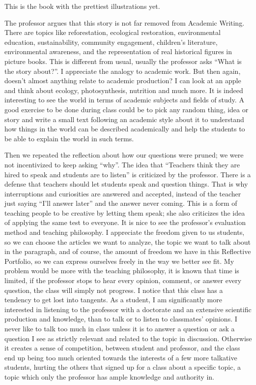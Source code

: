 This is the book with the prettiest illustrations yet.

The professor argues that this story is not far removed from Academic Writing. There are topics like reforestation, ecological restoration, environmental education, sustainability, community engagement, children's literature, environmental awareness, and the representation of real historical figures in picture books. This is different from usual, usually the professor asks ``What is the story about?''. I appreciate the analogy to academic work. But then again, doesn't almost anything relate to academic production? I can look at an apple and think about ecology, photosynthesis, nutrition and much more. It is indeed interesting to see the world in terms of academic subjects and fields of study. A good exercise to be done during class could be to pick any random thing, idea or story and write a small text following an academic style about it to understand how things in the world can be described academically and help the students to be able to explain the world in such terms.

Then we repeated the reflection about how our questions were pruned; we were not incentivized to keep asking ``why''. The idea that ``Teachers think they are hired to speak and students are to listen'' is criticized by the professor. There is a defense that teachers should let students speak and question things. That is why interruptions and curiosities are answered and accepted, instead of the teacher just saying ``I'll answer later'' and the answer never coming. This is a form of teaching people to be creative by letting them speak; she also criticizes the idea of applying the same test to everyone. It is nice to see the professor's evaluation method and teaching philosophy. I appreciate the freedom given to us students, so we can choose the articles we want to analyze, the topic we want to talk about in the paragraph, and of course, the amount of freedom we have in this Reflective Portfolio, so we can express ourselves freely in the way we better see fit. My problem would be more with the teaching philosophy, it is known that time is limited, if the professor stops to hear every opinion, comment, or answer every question, the class will simply not progress. I notice that this class has a tendency to get lost into tangents. As a student, I am significantly more interested in listening to the professor with a doctorate and an extensive scientific production and knowledge, than to talk or to listen to classmates' opinions. I never like to talk too much in class unless it is to answer a question or ask a question I see as strictly relevant and related to the topic in discussion. Otherwise it creates a sense of competition, between student and professor, and the class end up being too much oriented towards the interests of a few more talkative students, hurting the others that signed up for a class about a specific topic, a topic which only the professor has ample knowledge and authority in.

